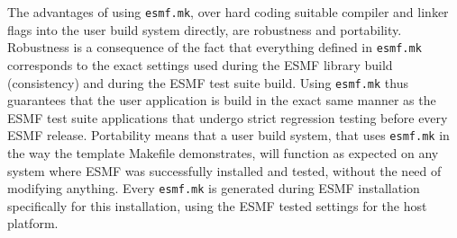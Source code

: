 The advantages of using {\tt esmf.mk}, over hard coding suitable compiler and linker flags into the user build system directly, are robustness and portability. Robustness is a consequence of the fact that everything defined in {\tt esmf.mk} corresponds to the exact settings used during the ESMF library build (consistency) and during the ESMF test suite build. Using {\tt esmf.mk} thus guarantees that the user application is build in the exact same manner as the ESMF test suite applications that undergo strict regression testing before every ESMF release. Portability means that a user build system, that uses {\tt esmf.mk} in the way the template Makefile demonstrates, will function as expected on any system where ESMF was successfully installed and tested, without the need of modifying anything. Every {\tt esmf.mk} is generated during ESMF installation specifically for this installation, using the ESMF tested settings for the host platform.

